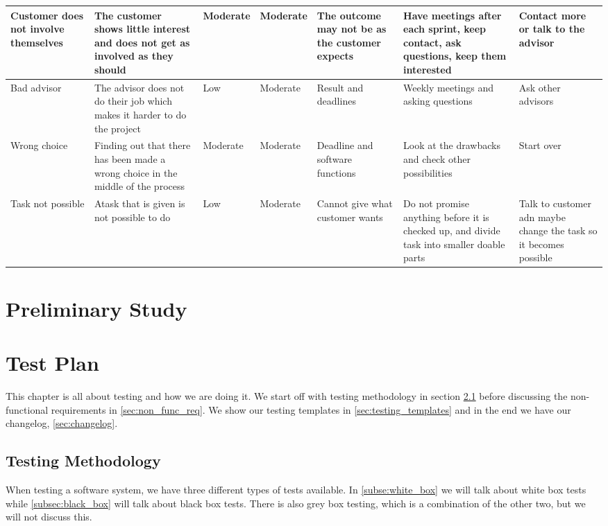\documentclass{report}
\begin{document}
\begin{landscape}
\begin{longtable}{| p{3cm} | p{4cm}| l | l | p{3cm} | p{4cm}| p{4cm} |}
Customer does not involve themselves & The customer shows little interest and does not get as involved as they should & Moderate & Moderate & The outcome may not be as the customer expects & Have meetings after each sprint, keep contact, ask questions, keep them interested & Contact more or talk to the advisor \\ \hline
Bad advisor & The advisor does not do their job which makes it harder to do the project & Low & Moderate & Result and deadlines & Weekly meetings and asking questions & Ask other advisors \\ \hline
Wrong choice & Finding out that there has been made a wrong choice in the middle of the process & Moderate & Moderate & Deadline and software functions & Look at the drawbacks and check other possibilities & Start over \\ \hline
Task not possible & Atask that is given is not possible to do & Low & Moderate & Cannot give what customer wants & Do not promise anything before it is checked up, and divide task into smaller doable parts & Talk to customer adn maybe change the task so it becomes possible \\ \hline

\end{longtable}
\end{landscape}
\restoregeometry




\chapter{Preliminary Study} \label{cha:preliminary_study}



\chapter{Test Plan} \label{cha:test_plan}
This chapter is all about testing and how we are doing it. We start off with testing methodology in section \ref{sec:testing_met} before discussing the non-functional requirements in \ref{sec:non_func_req}. We show our testing templates in \ref{sec:testing_templates} and in the end we have our changelog, \ref{sec:changelog}.

\section{Testing Methodology} \label{sec:testing_met}
When testing a software system, we have three different types of tests available. In \ref{subse:white_box} we will talk about white box tests while \ref{subsec:black_box} will talk about black box tests. There is also grey box testing, which is a combination of the other two, but we will not discuss this.
\end{document}
